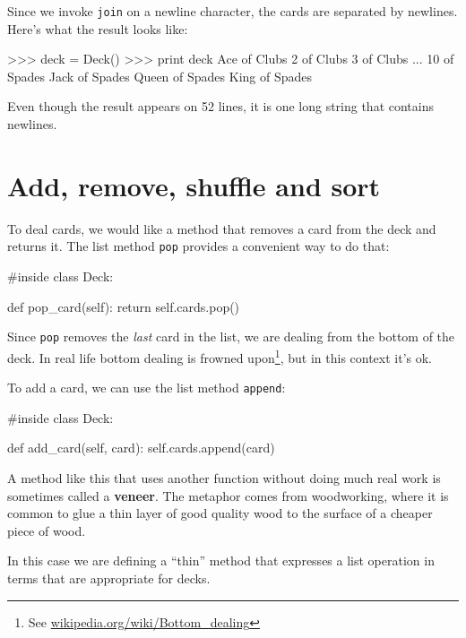 
Since we invoke {\tt join} on a newline character, the cards
are separated by newlines.  Here's what the result looks like:

\beforeverb
\begin{pyinterpreter}
>>> deck = Deck()
>>> print deck
Ace of Clubs
2 of Clubs
3 of Clubs
...
10 of Spades
Jack of Spades
Queen of Spades
King of Spades
\end{pyinterpreter}
\afterverb
%
Even though the result appears on 52 lines, it is
one long string that contains newlines.


\section{Add, remove, shuffle and sort}

To deal cards, we would like a method that
removes a card from the deck and returns it.
The list method {\tt pop} provides a convenient way to do that:


\beforeverb
\begin{pycode}
#inside class Deck:

    def pop_card(self):
        return self.cards.pop()
\end{pycode}
\afterverb
%
Since {\tt pop} removes the {\em last} card in the list, we are
dealing from the bottom of the deck.  In real life bottom dealing is
frowned upon\footnote{See \url{wikipedia.org/wiki/Bottom_dealing}},
but in this context it's ok.


To add a card, we can use the list method {\tt append}:

\beforeverb
\begin{pycode}
#inside class Deck:

    def add_card(self, card):
        self.cards.append(card)
\end{pycode}
\afterverb
%
A method like this that uses another function without doing
much real work is sometimes called a {\bf veneer}.  The metaphor
comes from woodworking, where it is common to glue a thin
layer of good quality wood to the surface of a cheaper piece of
wood.


In this case we are defining a ``thin'' method that expresses
a list operation in terms that are appropriate for decks.

